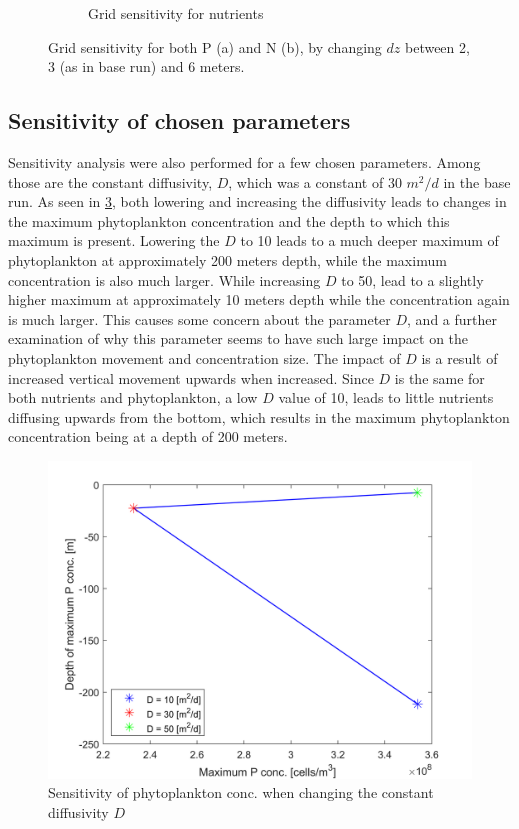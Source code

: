 \begin{figure}[h]
\begin{subfigure}{.5\textwidth}
  \caption{Grid sensitivity for nutrients}
  \label{fig:GridSensN}
\end{subfigure}
\caption{Grid sensitivity for both P (a) and N (b), by changing $dz$ between 2, 3 (as in base run) and 6 meters.}
\label{fig:GridSens}
\end{figure}

\subsection{Sensitivity of chosen parameters}
Sensitivity analysis were also performed for a few chosen parameters. Among those are the constant diffusivity, $D$, which was a constant of 30 $m^2/d$ in the base run. As seen in \cref{fig:DSens}, both lowering and increasing the diffusivity leads to changes in the maximum phytoplankton concentration and the depth to which this maximum is present. Lowering the $D$ to 10 leads to a much deeper maximum of phytoplankton at approximately 200 meters depth, while the maximum concentration is also much larger. While increasing $D$ to 50, lead to a slightly higher maximum at approximately 10 meters depth while the concentration again is much larger. This causes some concern about the parameter $D$, and a further examination of why this parameter seems to have such large impact on the phytoplankton movement and concentration size.
The impact of $D$ is a result of increased vertical movement upwards when increased. Since $D$ is the same for both nutrients and phytoplankton, a low $D$ value of 10, leads to little nutrients diffusing upwards from the bottom, which results in the maximum phytoplankton concentration being at a depth of 200 meters. 
\begin{figure}[h]
\centering
\includegraphics[width=\linewidth]{Pictures/Dsensitivity.png}
\caption{Sensitivity of phytoplankton conc. when changing the constant diffusivity $D$}
\label{fig:DSens}
\end{figure}


